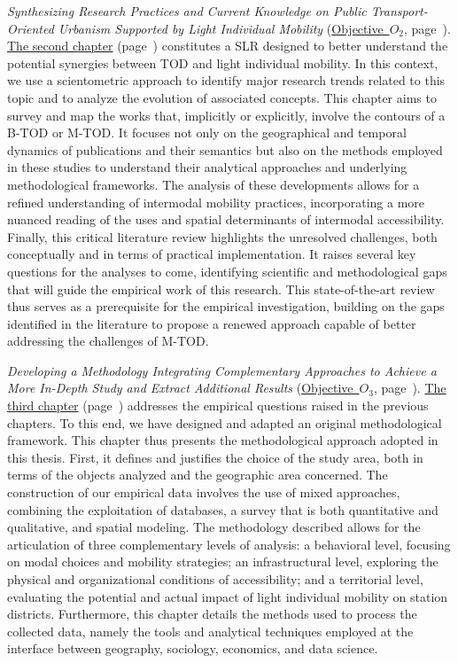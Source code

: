 \textsl{Synthesizing Research Practices and Current Knowledge on Public Transport-Oriented Urbanism Supported by Light Individual Mobility} (\hyperref[objectif-2]{Objective~\(O_2\)}, page~\pageref{objectif-2}). \hyperref[chap2:titre]{The second chapter} (page~\pageref{chap2:titre}) constitutes a \acrfull{SLR} designed to better understand the potential synergies between \acrshort{TOD} and light individual mobility. In this context, we use a scientometric approach to identify major research trends related to this topic and to analyze the evolution of associated concepts. This chapter aims to survey and map the works that, implicitly or explicitly, involve the contours of a \acrshort{B-TOD} or \acrshort{M-TOD}. It focuses not only on the geographical and temporal dynamics of publications and their semantics but also on the methods employed in these studies to understand their analytical approaches and underlying methodological frameworks. The analysis of these developments allows for a refined understanding of intermodal mobility practices, incorporating a more nuanced reading of the uses and spatial determinants of intermodal accessibility. Finally, this critical literature review highlights the unresolved challenges, both conceptually and in terms of practical implementation. It raises several key questions for the analyses to come, identifying scientific and methodological gaps that will guide the empirical work of this research. This state-of-the-art review thus serves as a prerequisite for the empirical investigation, building on the gaps identified in the literature to propose a renewed approach capable of better addressing the challenges of \acrshort{M-TOD}.%

\textsl{Developing a Methodology Integrating Complementary Approaches to Achieve a More In-Depth Study and Extract Additional Results} (\hyperref[objectif-3]{Objective~\(O_3\)}, page~\pageref{objectif-3}). \hyperref[chap3:titre]{The third chapter} (page~\pageref{chap3:titre}) addresses the empirical questions raised in the previous chapters. To this end, we have designed and adapted an original methodological framework. This chapter thus presents the methodological approach adopted in this thesis. First, it defines and justifies the choice of the study area, both in terms of the objects analyzed and the geographic area concerned. The construction of our empirical data involves the use of mixed approaches, combining the exploitation of databases, a survey that is both quantitative and qualitative, and spatial modeling. The methodology described allows for the articulation of three complementary levels of analysis: a behavioral level, focusing on modal choices and mobility strategies; an infrastructural level, exploring the physical and organizational conditions of accessibility; and a territorial level, evaluating the potential and actual impact of light individual mobility on station districts. Furthermore, this chapter details the methods used to process the collected data, namely the tools and analytical techniques employed at the interface between geography, sociology, economics, and data science.%